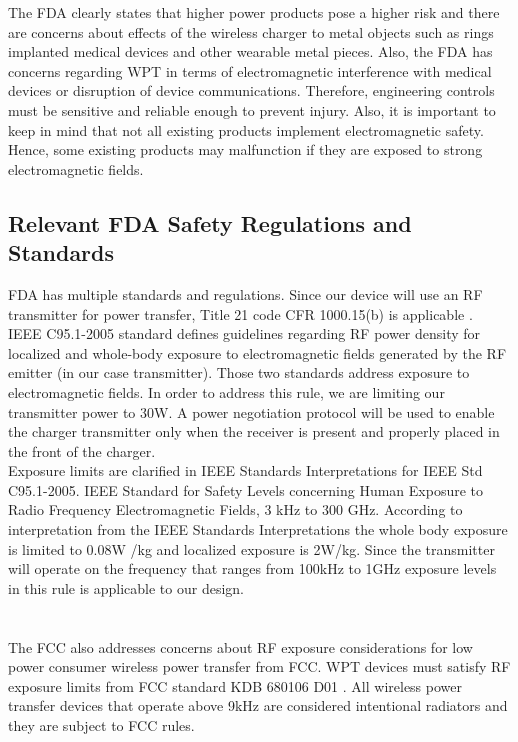 \documentclass[12pt]{article}
\begin{document}
\indent
The FDA clearly states that higher power products pose a higher risk and there are concerns about effects of the wireless charger to metal objects such as rings implanted medical devices and other wearable metal pieces. Also, the FDA has concerns regarding WPT in terms of electromagnetic interference with medical devices or disruption of device communications. Therefore, engineering controls must be sensitive and reliable enough to prevent injury. Also, it is important to keep in mind that not all existing products implement electromagnetic safety. Hence, some existing products may malfunction if they are exposed to strong electromagnetic fields.  \\

\subsection{Relevant FDA Safety Regulations and Standards}
\indent \indent
FDA has multiple standards and regulations. Since our device will use an RF transmitter  for power transfer, Title 21 code CFR 1000.15(b) is applicable \cite{21cfr1000}. \\

\indent
IEEE C95.1-2005 standard defines guidelines regarding RF power density for localized and whole-body exposure to electromagnetic fields generated by the RF emitter \cite{ieeec95} (in our case transmitter). Those two standards address exposure to electromagnetic fields. In order to address this rule, we are limiting our transmitter power to 30W\cite{ieeec95}. A power negotiation protocol will be used to enable the charger transmitter only when the receiver is present and properly placed in the front of the charger. \\

\indent
Exposure limits are clarified in IEEE Standards Interpretations for IEEE Std C95.1-2005. IEEE Standard for Safety Levels concerning Human Exposure to Radio Frequency Electromagnetic Fields, 3 kHz to 300 GHz. According to interpretation from  the IEEE  Standards Interpretations the whole body exposure is limited to 0.08W /kg and localized exposure is 2W/kg.
Since the transmitter will operate on the frequency that ranges from 100kHz to 1GHz exposure levels in this rule is applicable  to our design.\\
\hfill \\
\pagebreak
\hfill \\
\indent
The FCC also addresses concerns about  RF exposure considerations for low power consumer wireless power transfer from FCC. %
WPT devices must satisfy RF exposure limits from FCC standard KDB 680106 D01 \cite{fcc15}\cite{fcc18}\cite{fccsum}. 
All wireless power transfer devices that operate above 9kHz are considered intentional radiators and they are subject to FCC rules. \\
\end{document}
